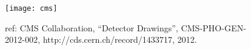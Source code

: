 \begin{figure}[!h]
  \centering
  \texttt{[image: cms]}
  \caption {ref: CMS Collaboration, ``Detector Drawings'', CMS-PHO-GEN-2012-002, http://cds.cern.ch/record/1433717, 2012. }\label{cms}
\end{figure}

